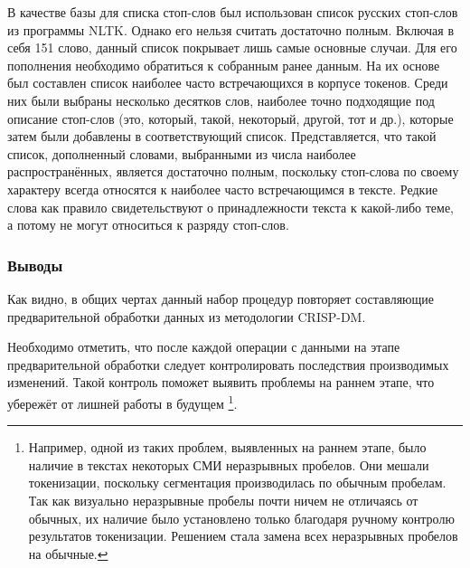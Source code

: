 В качестве базы для списка стоп-слов был использован список русских стоп-слов из программы NLTK. Однако его нельзя считать достаточно полным. Включая в себя 151 слово, данный список покрывает лишь самые основные случаи. Для его пополнения необходимо обратиться к собранным ранее данным. На их основе был составлен список наиболее часто встречающихся в корпусе токенов. Среди них были выбраны несколько десятков слов, наиболее точно подходящие под описание стоп-слов (это, который, такой, некоторый, другой, тот и др.), которые затем были добавлены в соответствующий список. Представляется, что такой список, дополненный словами, выбранными из числа наиболее распространённых, является достаточно полным, поскольку стоп-слова по своему характеру всегда относятся к наиболее часто встречающимся в тексте. Редкие слова как правило свидетельствуют о принадлежности текста к какой-либо теме, а потому не могут относиться к разряду стоп-слов.


\subsubsection{Выводы}
Как видно, в общих чертах данный набор процедур повторяет составляющие предварительной обработки данных из методологии CRISP-DM.

Необходимо отметить, что после каждой операции с данными на этапе предварительной обработки следует контролировать последствия производимых изменений. Такой контроль поможет выявить проблемы на раннем этапе, что убережёт от лишней работы в будущем \footnote{Например, одной из таких проблем, выявленных на раннем этапе, было наличие в текстах некоторых СМИ неразрывных пробелов. Они мешали токенизации, поскольку сегментация производилась по обычным пробелам. Так как визуально неразрывные пробелы почти ничем не отличаясь от обычных, их наличие было установлено только благодаря ручному контролю результатов токенизации. Решением стала замена всех неразрывных пробелов на обычные.}.

